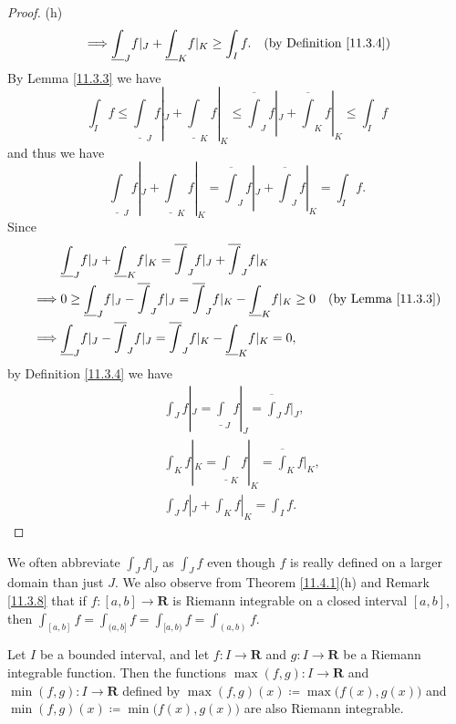 \begin{proof}{(h)}
\begin{align*}
        \implies & \underline{\int}_J f|_J + \underline{\int}_K f|_K \geq \int_I f.                               & \text{(by Definition \ref{11.3.4})}
    \end{align*}
    By Lemma \ref{11.3.3} we have
    \[
        \int_I f \leq \underline{\int}_J f|_J + \underline{\int}_K f|_K \leq \overline{\int}_J f|_J + \overline{\int}_K f|_K \leq \int_I f
    \]
    and thus we have
    \[
        \underline{\int}_J f|_J + \underline{\int}_K f|_K = \overline{\int}_J f|_J + \overline{\int}_J f|_K = \int_I f.
    \]
    Since
    \begin{align*}
                 & \underline{\int}_J f|_J + \underline{\int}_K f|_K = \overline{\int}_J f|_J + \overline{\int}_J f|_K                                                \\
        \implies & 0 \geq \underline{\int}_J f|_J - \overline{\int}_J f|_J = \overline{\int}_J f|_K - \underline{\int}_K f|_K \geq 0 & \text{(by Lemma \ref{11.3.3})} \\
        \implies & \underline{\int}_J f|_J - \overline{\int}_J f|_J = \overline{\int}_J f|_K - \underline{\int}_K f|_K = 0,
    \end{align*}
    by Definition \ref{11.3.4} we have
    \begin{align*}
         & \int_J f|_J = \underline{\int}_J f|_J = \overline{\int}_J f|_J, \\
         & \int_K f|_K = \underline{\int}_K f|_K = \overline{\int}_K f|_K, \\
         & \int_J f|_J + \int_K f|_K = \int_I f.
    \end{align*}
\end{proof}

\begin{remark}\label{11.4.2}
    We often abbreviate \(\int_J f|_J\) as \(\int_J f\) even though \(f\) is really defined on a larger domain than just \(J\).
    We also observe from Theorem \ref{11.4.1}(h) and Remark \ref{11.3.8} that if \(f : [a, b] \to \mathbf{R}\) is Riemann integrable on a closed interval \([a, b]\), then \(\int_{[a, b]} f = \int_{(a, b]} f = \int_{[a, b)} f = \int_{(a, b)} f\).
\end{remark}

\begin{theorem}\label{11.4.3}
    Let \(I\) be a bounded interval, and let \(f : I \to \mathbf{R}\) and \(g : I \to \mathbf{R}\) be a Riemann integrable function.
    Then the functions \(\max(f, g) : I \to \mathbf{R}\) and \(\min(f, g) : I \to \mathbf{R}\) defined by \(\max(f, g)(x) \coloneqq \max\big(f(x), g(x)\big)\) and \(\min(f, g)(x) \coloneqq \min\big(f(x), g(x)\big)\) are also Riemann integrable.
\end{theorem}


